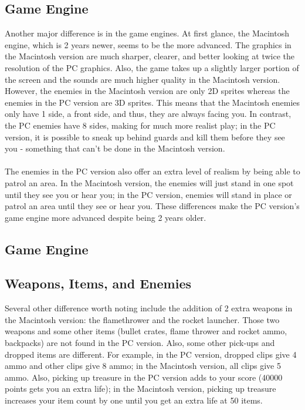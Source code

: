\documentclass[book.tex]{subfiles}
\begin{document}
\subsection{Game Engine}
Another major difference is in the game engines. At first glance, the Macintosh engine, which is 2 years newer, seems to be the more advanced. The graphics in the Macintosh version are much sharper, clearer, and better looking at twice the resolution of the PC graphics. Also, the game takes up a slightly larger portion of the screen and the sounds are much higher quality in the Macintosh version.\\
However, the enemies in the Macintosh version are only 2D sprites whereas the enemies in the PC version are 3D sprites. This means that the Macintosh enemies only have 1 side, a front side, and thus, they are always facing you. In contrast, the PC enemies have 8 sides, making for much more realist play; in the PC version, it is possible to sneak up behind guards and kill them before they see you - something that can't be done in the Macintosh version.\\
\\
The enemies in the PC version also offer an extra level of realism by being able to patrol an area. In the Macintosh version, the enemies will just stand in one spot until they see you or hear you; in the PC version, enemies will stand in place or patrol an area until they see or hear you. These differences make the PC version's game engine more advanced despite being 2 years older.\\
\subsection{Game Engine}


\subsection{Weapons, Items, and Enemies}

Several other difference worth noting include the addition of 2 extra weapons in the Macintosh version: the flamethrower and the rocket launcher. Those two weapons and some other items (bullet crates, flame thrower and rocket ammo, backpacks) are not found in the PC version.
Also, some other pick-ups and dropped items are different. For example, in the PC version, dropped clips give 4 ammo and other clips give 8 ammo; in the Macintosh version, all clips give 5 ammo. Also, picking up treasure in the PC version adds to your score (40000 points gets you an extra life); in the Macintosh version, picking up treasure increases your item count by one until you get an extra life at 50 items.
\end{document}
